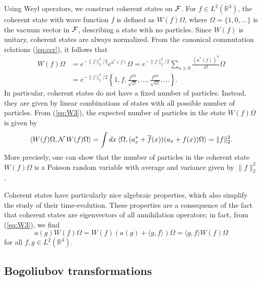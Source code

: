 \documentclass[11pt,a4paper]{article}
\newcommand{\bR}{{\mathbb R}}
\newcommand{\cF}{{\cal F}}
\newcommand{\cN}{{\cal N}}
\begin{document}
Using Weyl operators, we construct coherent states on $\cF$. For $f \in L^2 (\bR^3)$, the coherent state with wave function $f$ is defined as $W(f) \Omega$, where $\Omega = \{ 1, 0, \dots \}$ is the vacuum vector in $\cF$, describing a state with no particles. Since $W(f)$ is unitary, coherent states are always normalized. {F}rom the canonical commutation relations (\ref{eq:ccr}), it follows that  
\[ \begin{split} 
W(f) \Omega &= e^{-\| f \|_2^2 /2} e^{a^* (f)} \Omega = e^{-\| f\|_2^2/2}
\sum_{n \geq 0} \frac{(a^* (f))^n}{n!} \Omega \\ &= e^{-\| f\|_2^2/2}
\left\{ 1 , f , \frac{f^{\otimes 2}}{\sqrt{2!}} , \dots , \frac{f^{\otimes
n}}{\sqrt{n!}} , \dots \right\}. \end{split} \]
In particular, coherent states do not have a fixed number of particles. Instead, they are given by linear combinations of states with all possible number of particles. {F}rom (\ref{eq:W3}), the expected 
number of particles in the state $W(f) \Omega$ is given by
\[ \langle W(f) \Omega, \cN \, W(f) \Omega \rangle = \int dx \, \langle \Omega, (a_x^* + \overline{f} (x)) (a_x + f(x)) \Omega \rangle = \| f \|_2^2. \]
More precisely, one can show that the number of particles in the coherent state $W(f) \Omega$ is a Poisson random variable with average and variance given by $\| f \|_2^2$. 

Coherent states have particularly nice algebraic properties, which also simplify the study of their time-evolution. These properties are a consequence of the fact that coherent states are eigenvectors of all annihilation operators; in fact, from (\ref{eq:W3}), we find 
\[  a(g) W(f) \Omega = W(f) ( a(g) + \langle g , f \rangle ) \Omega = \langle g ,f \rangle W(f) \Omega \]
for all $f,g \in L^2 (\bR^3)$.


\subsection{Bogoliubov transformations}
\label{sec:bt}
\end{document}
